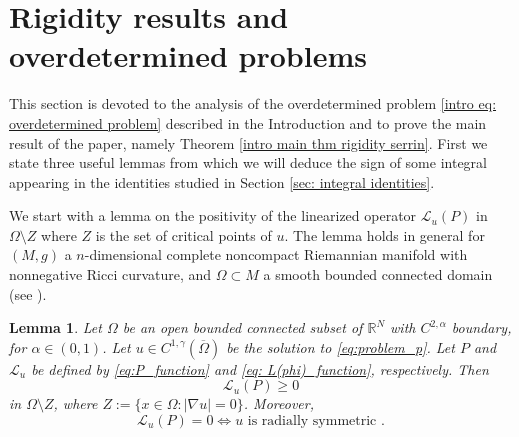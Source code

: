 \documentclass[10pt,a4paper]{amsart}
\numberwithin{equation}{section}
\newcommand{\R}{\mathbb{R}}
\newtheorem{lemma}[teo]{Lemma}
\begin{document}
    \section{Rigidity results and overdetermined problems}\label{sec: rigidity}
    This section is devoted to the analysis of the overdetermined problem \eqref{intro eq: overdetermined problem} described in the Introduction and to prove the main result of the paper, namely Theorem \ref{intro main thm rigidity serrin}. First we state three useful lemmas from which we will deduce the sign of some integral appearing in the identities studied in Section \ref{sec: integral identities}.
    
    We start with a lemma on the positivity of the linearized operator $\mathcal{L}_u(P)$ in $\Omega \setminus Z$ where $Z$ is the set of critical points of $u$. The lemma holds in general for $(M, g)$ a $n$-dimensional complete noncompact Riemannian manifold with nonnegative Ricci curvature, and $\Omega \subset M$ a smooth bounded connected domain (see \cite[Lem.\,4]{RuHuCh24}).

    \begin{lemma}\label{lemma positivity L(P)}
        Let $\Omega$ be an open bounded connected subset of $\R^N$ with $C^{2,\alpha}$ boundary, for $\alpha \in (0,1)$. Let $u \in C^{1,\gamma}(\overline{\Omega})$ be the solution to \eqref{eq:problem_p}. Let $P$ and $\mathcal{L}_u$ be defined by \eqref{eq:P_function} and \eqref{eq: L(phi)_function}, respectively. Then
        \begin{equation*}
            \mathcal{L}_u(P) \geq 0
        \end{equation*}
        in $\Omega\setminus Z$, where $Z := \{x \in \Omega \colon |\nabla u| = 0\}$. Moreover, 
        \begin{equation*}
            \mathcal{L}_u(P) = 0  \iff u \text{ is radially symmetric }.
        \end{equation*}
    \end{lemma}
\end{document}
